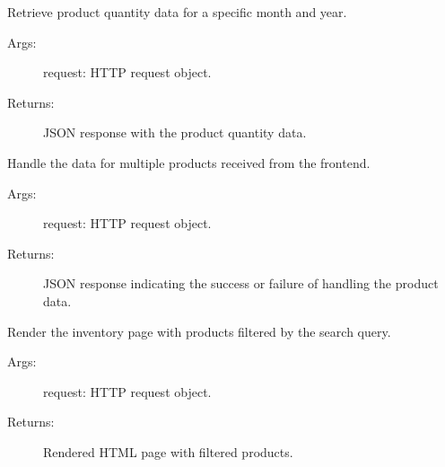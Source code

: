 \documentclass[letterpaper,10pt,english]{sphinxmanual}
\begin{document}
\begin{fulllineitems}
\label{\detokenize{modules/views:Inventory.views.GetProductQuantityData}}
\sphinxAtStartPar
Retrieve product quantity data for a specific month and year.
\begin{description}
\item[{Args:}] \leavevmode
\sphinxAtStartPar
request: HTTP request object.

\item[{Returns:}] \leavevmode
\sphinxAtStartPar
JSON response with the product quantity data.

\end{description}

\end{fulllineitems}


\begin{fulllineitems}
\label{\detokenize{modules/views:Inventory.views.HandleProductData}}
\sphinxAtStartPar
Handle the data for multiple products received from the frontend.
\begin{description}
\item[{Args:}] \leavevmode
\sphinxAtStartPar
request: HTTP request object.

\item[{Returns:}] \leavevmode
\sphinxAtStartPar
JSON response indicating the success or failure of handling the product data.

\end{description}

\end{fulllineitems}


\begin{fulllineitems}
\label{\detokenize{modules/views:Inventory.views.Inventory}}
\sphinxAtStartPar
Render the inventory page with products filtered by the search query.
\begin{description}
\item[{Args:}] \leavevmode
\sphinxAtStartPar
request: HTTP request object.

\item[{Returns:}] \leavevmode
\sphinxAtStartPar
Rendered HTML page with filtered products.

\end{description}

\end{fulllineitems}
\end{document}
